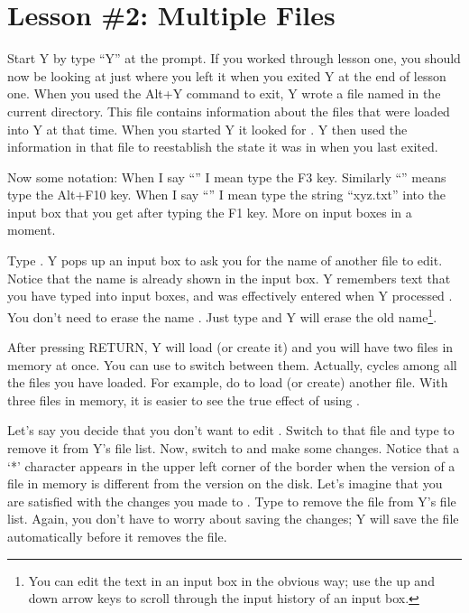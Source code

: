 \section{Lesson \#2: Multiple Files}

Start Y by type ``Y'' at the prompt. If you worked through lesson one, you should now be looking
at  just where you left it when you exited Y at the end of lesson one. When
you used the Alt+Y command to exit, Y wrote a file named  in the current
directory. This file contains information about the files that were loaded into Y at that time.
When you started Y it looked for . Y then used the information in that
file to reestablish the state it was in when you last exited.

Now some notation: When I say ``'' I mean type the F3 key. Similarly
``'' means type the Alt+F10 key. When I say ``'' I mean type
the string ``xyz.txt'' into the input box that you get after typing the F1 key. More on input
boxes in a moment.

Type . Y pops up an input box to ask you for the name of another file to edit. Notice
that the name  is already shown in the input box. Y remembers text that you
have typed into input boxes, and  was effectively entered when Y processed
. You don't need to erase the name . Just type
 and Y will erase the old name\footnote{You can edit the text in an input
  box in the obvious way; use the up and down arrow keys to scroll through the input history of
  an input box.}.

After pressing RETURN, Y will load  (or create it) and you will have two
files in memory at once. You can use  to switch between them. Actually, 
cycles among all the files you have loaded. For example, do  to load (or
create) another file. With three files in memory, it is easier to see the true effect of using
.

Let's say you decide that you don't want to edit . Switch to that file and
type  to remove it from Y's file list. Now, switch to  and make
some changes. Notice that a `*' character appears in the upper left corner of the border when
the version of a file in memory is different from the version on the disk. Let's imagine that
you are satisfied with the changes you made to . Type  to remove
the file from Y's file list. Again, you don't have to worry about saving the changes; Y will
save the file automatically before it removes the file.

